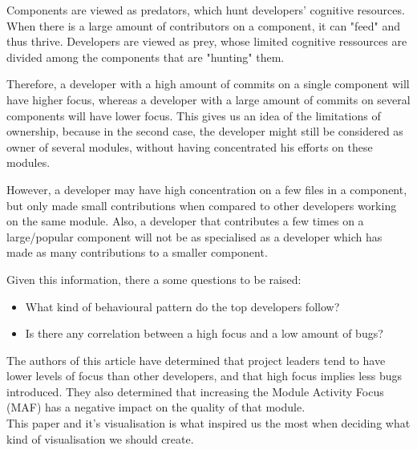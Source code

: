 Components are viewed as predators, which hunt developers' cognitive resources. When there is a large amount of contributors on a component, it can "feed" and thus thrive.
Developers are viewed as prey, whose limited cognitive ressources are divided among the components that are "hunting" them.

Therefore, a developer with a high amount of commits on a single component will have higher focus, whereas a developer with a large amount of commits on several components will have lower focus.
This gives us an idea of the limitations of ownership, because in the second case, the developer might still be considered as owner of several modules, without having concentrated his efforts on these modules.

However, a developer may have high concentration on a few files in a component, but only made small contributions when compared to other developers working on the same module.
Also, a developer that contributes a few times on a large/popular component will not be as specialised as a developer which has made as many contributions to a smaller component.

Given this information, there a some questions to be raised:
\begin{itemize}
\itemsep-0.2em
\item What kind of behavioural pattern do the top developers follow?
\item Is there any correlation between a high focus and a low amount of bugs?
\end{itemize}

The authors of this article have determined that project leaders tend to have lower levels of focus than other developers, and that high focus implies less bugs introduced. They also determined that increasing the Module Activity Focus (MAF) has a negative impact on the quality of that module.\\

This paper and it's visualisation is what inspired us the most when deciding what kind of visualisation we should create.